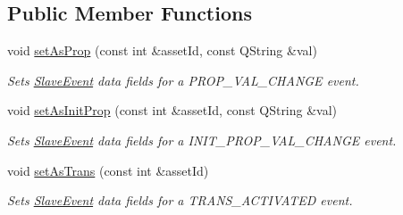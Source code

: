 \subsection*{Public Member Functions}
\begin{DoxyCompactItemize}
\item 
\hypertarget{class_picto_1_1_slave_event_a6f23fcc3bcb3b3ed19c5afd64151bf55}{void \hyperlink{class_picto_1_1_slave_event_a6f23fcc3bcb3b3ed19c5afd64151bf55}{set\-As\-Prop} (const int \&asset\-Id, const Q\-String \&val)}\label{class_picto_1_1_slave_event_a6f23fcc3bcb3b3ed19c5afd64151bf55}

\begin{DoxyCompactList}\small\item\em Sets \hyperlink{class_picto_1_1_slave_event}{Slave\-Event} data fields for a P\-R\-O\-P\-\_\-\-V\-A\-L\-\_\-\-C\-H\-A\-N\-G\-E event. \end{DoxyCompactList}\item 
\hypertarget{class_picto_1_1_slave_event_ade71eb5c8c27dc3f5fc468fffc902ef5}{void \hyperlink{class_picto_1_1_slave_event_ade71eb5c8c27dc3f5fc468fffc902ef5}{set\-As\-Init\-Prop} (const int \&asset\-Id, const Q\-String \&val)}\label{class_picto_1_1_slave_event_ade71eb5c8c27dc3f5fc468fffc902ef5}

\begin{DoxyCompactList}\small\item\em Sets \hyperlink{class_picto_1_1_slave_event}{Slave\-Event} data fields for a I\-N\-I\-T\-\_\-\-P\-R\-O\-P\-\_\-\-V\-A\-L\-\_\-\-C\-H\-A\-N\-G\-E event. \end{DoxyCompactList}\item 
\hypertarget{class_picto_1_1_slave_event_a03cd1f872d51ac1b6c5cafd1bc0141cf}{void \hyperlink{class_picto_1_1_slave_event_a03cd1f872d51ac1b6c5cafd1bc0141cf}{set\-As\-Trans} (const int \&asset\-Id)}\label{class_picto_1_1_slave_event_a03cd1f872d51ac1b6c5cafd1bc0141cf}

\begin{DoxyCompactList}\small\item\em Sets \hyperlink{class_picto_1_1_slave_event}{Slave\-Event} data fields for a T\-R\-A\-N\-S\-\_\-\-A\-C\-T\-I\-V\-A\-T\-E\-D event. \end{DoxyCompactList}\end{DoxyCompactItemize}
